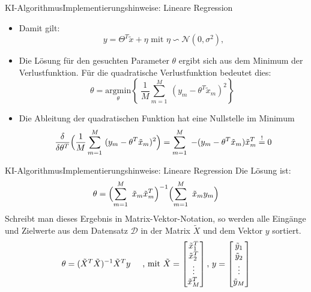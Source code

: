 \documentclass[169, handout	]{THIbeamer} %
\begin{document}
	\begin{frame}{KI-Algorithmus}{Implementierungshinweise: Lineare Regression}
		\begin{itemize}
			\item Damit gilt:
			\begin{equation}
				y = \Theta^T \tilde{x} + \eta \text{ mit } \eta \backsim \mathcal{N}(0, \sigma^2) \text{,}
			\end{equation}
			\item Die Lösung für den gesuchten Parameter $\theta$ ergibt sich aus dem Minimum der Verlustfunktion. Für die quadratische Verlustfunktion bedeutet dies:
			\begin{equation}
				\theta = \underset{\theta}{\mathrm{argmin}} \left\{\ \frac{1}{M} \sum_{m=1}^M\ (y_m - \theta^T \tilde{x}_m)^2 \right\}\
			\end{equation}
			\item Die Ableitung der quadratischen Funktion hat eine Nullstelle im Minimum					\begin{equation}
				\frac{\delta}{\delta \theta^T} \Bigl( \frac{1}{M} \sum_{m=1}^M\ (y_m - \theta^T \tilde{x}_m)^2 \Bigr) 
				= \sum_{m=1}^M\ -(y_m - \theta^T \tilde{x}_m) \tilde{x}_m^T
				\stackrel{!}{=} 0 
			\end{equation}

		\end{itemize}
	\end{frame}
	\begin{frame}{KI-Algorithmus}{Implementierungshinweise: Lineare Regression}
		Die Lösung ist:
		\begin{equation}
				\theta = \Bigl( \sum_{m=1}^M\ \tilde{x}_m \tilde{x}_m^T \Bigr)^{-1} \Bigl( \sum_{m=1}^M\ \tilde{x}_m y_m \Bigr)
		\end{equation}
		Schreibt man dieses Ergebnis in Matrix-Vektor-Notation, so werden alle Eingänge und Zielwerte aus dem Datensatz $\mathcal{D}$ in der Matrix $\tilde{X}$ und dem Vektor $y$ sortiert. 
		\begin{equation}
			\theta = ( \tilde{X}^T \tilde{X} )^{-1} \tilde{X}^T y
			\hspace{0.5 cm}	
			\text{, mit }			
			\tilde{X} = 
			\begin{bmatrix}
				\tilde{x}_1^T \\
				\tilde{x}_2^T \\	
				\vdots \\
				\tilde{x}_M^T \\		
			\end{bmatrix}
			\text{,  }
			y =	
			\begin{bmatrix}
				\tilde{y}_1 \\
				\tilde{y}_2 \\	
				\vdots \\
				\tilde{y}_M \\
			\end{bmatrix}						
		\end{equation}
	\end{frame}
	
\end{document}
